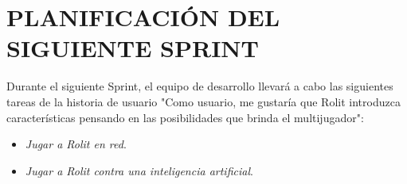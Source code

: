 \documentclass{article}
\begin{document}
\section{PLANIFICACIÓN DEL SIGUIENTE SPRINT}
Durante el siguiente Sprint, el equipo de desarrollo llevará a cabo las siguientes tareas de la historia de usuario "Como usuario, me gustaría que Rolit introduzca características pensando en las posibilidades que brinda el multijugador":
\begin{itemize}
\item \textit{Jugar a Rolit en red}.
\item \textit{Jugar a Rolit contra una inteligencia artificial}.
\end{itemize}
\end{document}
